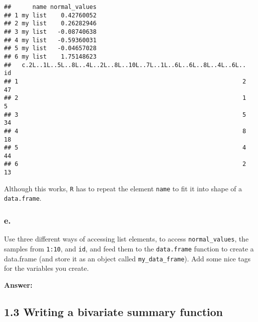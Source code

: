 \documentclass[]{article}
\newenvironment{Shaded}{\begin{snugshade}}{\end{snugshade}}
\newcommand{\DataTypeTok}[1]{\textcolor[rgb]{0.13,0.29,0.53}{#1}}
\newcommand{\DecValTok}[1]{\textcolor[rgb]{0.00,0.00,0.81}{#1}}
\newcommand{\KeywordTok}[1]{\textcolor[rgb]{0.13,0.29,0.53}{\textbf{#1}}}
\newcommand{\NormalTok}[1]{#1}
\newcommand{\OperatorTok}[1]{\textcolor[rgb]{0.81,0.36,0.00}{\textbf{#1}}}
\newcommand{\StringTok}[1]{\textcolor[rgb]{0.31,0.60,0.02}{#1}}
\begin{document}
\begin{verbatim}
##      name normal_values
## 1 my list    0.42760052
## 2 my list    0.26282946
## 3 my list   -0.08740638
## 4 my list   -0.59360031
## 5 my list   -0.04657028
## 6 my list    1.75148623
##   c.2L..1L..5L..8L..4L..2L..8L..10L..7L..1L..6L..6L..8L..4L..6L.. id
## 1                                                               2 47
## 2                                                               1  5
## 3                                                               5 34
## 4                                                               8 18
## 5                                                               4 44
## 6                                                               2 13
\end{verbatim}

Although this works, \texttt{R} has to repeat the element \texttt{name}
to fit it into shape of a \texttt{data.frame}.

\hypertarget{e.}{%
\subsubsection{e.}\label{e.}}

Use three different ways of accessing list elements, to access
\texttt{normal\_values}, the samples from \texttt{1:10}, and
\texttt{id}, and feed them to the \texttt{data.frame} function to create
a data.frame (and store it as an object called
\texttt{my\_data\_frame}). Add some nice tags for the variables you
create.

\textbf{Answer:}

\begin{Shaded}
\end{Shaded}

\hypertarget{writing-a-bivariate-summary-function}{%
\subsection{1.3 Writing a bivariate summary
function}\label{writing-a-bivariate-summary-function}}
\end{document}
